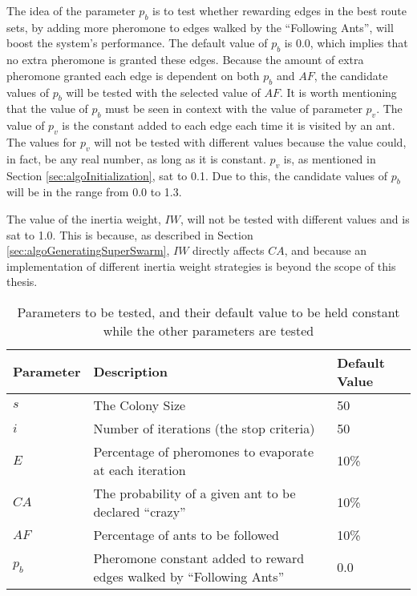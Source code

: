 The idea of the parameter $p_b$ is to test whether rewarding edges in the best route sets, by adding more pheromone to edges walked by the ``Following Ants'', will boost the system's performance. The default value of $p_b$ is 0.0, which implies that no extra pheromone is granted these edges. Because the amount of extra pheromone granted each edge is dependent on both $p_b$ and $AF$, the candidate values of $p_b$ will be tested with the selected value of $AF$. It is worth mentioning that the value of $p_b$ must be seen in context with the value of parameter $p_v$. The value of $p_v$ is the constant added to each edge each time it is visited by an ant. The values for $p_v$ will not be tested with different values because the value could, in fact, be any real number, as long as it is constant. $p_v$ is, as mentioned in Section \vref{sec:algoInitialization}, sat to 0.1. Due to this, the candidate values of $p_b$ will be in the range from 0.0 to 1.3. 

The value of the inertia weight, $IW$, will not be tested with different values and is sat to 1.0. This is because, as described in Section \vref{sec:algoGeneratingSuperSwarm}, $IW$ directly affects $CA$, and because an implementation of different inertia weight strategies is beyond the scope of this thesis. 

\begin{table}[H]
    \centering
    \begin{tabular}{|l|m{7cm}|l|}
        \hline
        \textbf{Parameter} & \textbf{Description} & \textbf{Default Value}\\
        \hline
        $s$ & The Colony Size & 50\\
        
        $i$ & Number of iterations (the stop criteria) & 50\\
        
        $E$ & Percentage of pheromones to evaporate at each iteration & 10\%\\
        
        $CA$ & The probability of a given ant to be declared ``crazy'' & 10\%\\
        
        $AF$ & Percentage of ants to be followed & 10\%\\
        
        $p_b$ & Pheromone constant added to reward edges walked by ``Following Ants'' & 0.0\\
           \hline
    \end{tabular}
    \caption {Parameters to be tested, and their default value to be held constant while the other parameters are tested}
    \label{table:parameters}
\end{table}

